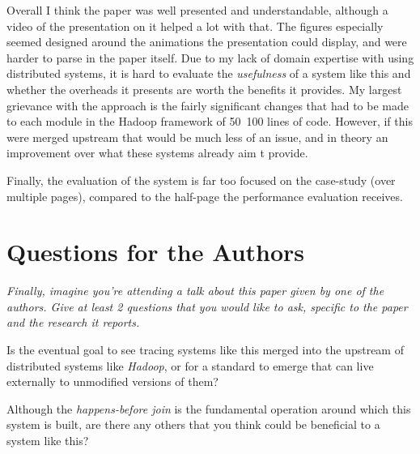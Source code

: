 \documentclass[11pt]{article}
\begin{document}
Overall I think the paper was well presented and understandable, although a
video of the presentation on it helped a lot with that. The figures especially
seemed designed around the animations the presentation could display, and were
harder to parse in the paper itself. Due to my lack of domain expertise with
using distributed systems, it is hard to evaluate the \textit{usefulness} of a
system like this and whether the overheads it presents are worth the benefits
it provides. My largest grievance with the approach is the fairly significant
changes that had to be made to each module in the Hadoop framework of 50~100
lines of code. However, if this were merged upstream that would be much less of
an issue, and in theory an improvement over what these systems already aim t
provide.

Finally, the evaluation of the system is far too focused on the case-study
(over multiple pages), compared to the half-page the performance evaluation
receives.


\section*{Questions for the Authors}

\textsl{Finally, imagine you're attending a talk about this paper given by one
of the authors. Give at least 2 questions that you would like to ask, specific
to the paper and the research it reports.}

Is the eventual goal to see tracing systems like this merged into the upstream
of distributed systems like \textit{Hadoop}, or for a standard to emerge that
can live externally to unmodified versions of them?

Although the \textit{happens-before join} is the fundamental operation around
which this system is built, are there any others that you think could be
beneficial to a system like this?




\end{document}
